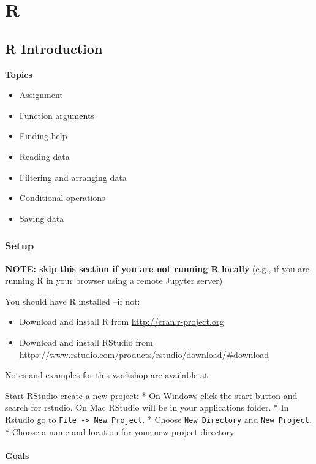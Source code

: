 \documentclass[]{book}
\providecommand{\tightlist}{%
  \setlength{\itemsep}{0pt}\setlength{\parskip}{0pt}}
\begin{document}
\part{R}\label{part-r}

\chapter{R Introduction}\label{r-introduction}

\textbf{Topics}

\begin{itemize}
\tightlist
\item
  Assignment
\item
  Function arguments
\item
  Finding help
\item
  Reading data
\item
  Filtering and arranging data
\item
  Conditional operations
\item
  Saving data
\end{itemize}

\section{Setup}\label{setup}

\textbf{NOTE: skip this section if you are not running R locally} (e.g.,
if you are running R in your browser using a remote Jupyter server)

You should have R installed --if not:

\begin{itemize}
\tightlist
\item
  Download and install R from \url{http://cran.r-project.org}
\item
  Download and install RStudio from
  \url{https://www.rstudio.com/products/rstudio/download/\#download}
\end{itemize}

Notes and examples for this workshop are available at
\href{http://tutorials.iq.harvard.edu/R/Rintro/Rintro.html}{}

Start RStudio create a new project: * On Windows click the start button
and search for rstudio. On Mac RStudio will be in your applications
folder. * In Rstudio go to \texttt{File\ -\textgreater{}\ New\ Project}.
* Choose \texttt{New\ Directory} and \texttt{New\ Project}. * Choose a
name and location for your new project directory.

\subsection{Goals}\label{goals}
\end{document}
